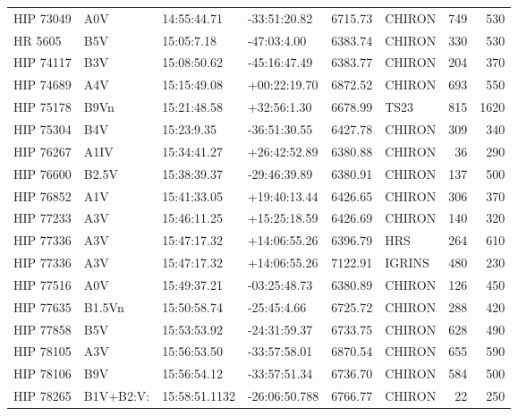 \documentclass{emulateapj}
\begin{document}
\begin{longtable*}{|l|lllrlrr|}
   HIP 73049 &            A0V &    14:55:44.71 &   -33:51:20.82 &  6715.73 &     CHIRON &      749 &     530 \\
     HR 5605 &            B5V &     15:05:7.18 &    -47:03:4.00 &  6383.74 &     CHIRON &      330 &     530 \\
   HIP 74117 &            B3V &    15:08:50.62 &   -45:16:47.49 &  6383.77 &     CHIRON &      204 &     370 \\
   HIP 74689 &            A4V &    15:15:49.08 &   +00:22:19.70 &  6872.52 &     CHIRON &      693 &     550 \\
   HIP 75178 &           B9Vn &    15:21:48.58 &    +32:56:1.30 &  6678.99 &       TS23 &      815 &    1620 \\
   HIP 75304 &            B4V &     15:23:9.35 &   -36:51:30.55 &  6427.78 &     CHIRON &      309 &     340 \\
   HIP 76267 &           A1IV &    15:34:41.27 &   +26:42:52.89 &  6380.88 &     CHIRON &       36 &     290 \\
   HIP 76600 &          B2.5V &    15:38:39.37 &   -29:46:39.89 &  6380.91 &     CHIRON &      137 &     500 \\
   HIP 76852 &            A1V &    15:41:33.05 &   +19:40:13.44 &  6426.65 &     CHIRON &      306 &     370 \\
   HIP 77233 &            A3V &    15:46:11.25 &   +15:25:18.59 &  6426.69 &     CHIRON &      140 &     320 \\
   HIP 77336 &            A3V &    15:47:17.32 &   +14:06:55.26 &  6396.79 &        HRS &      264 &     610 \\
   HIP 77336 &            A3V &    15:47:17.32 &   +14:06:55.26 &  7122.91 &     IGRINS &      480 &     230 \\
   HIP 77516 &            A0V &    15:49:37.21 &   -03:25:48.73 &  6380.89 &     CHIRON &      126 &     450 \\
   HIP 77635 &         B1.5Vn &    15:50:58.74 &    -25:45:4.66 &  6725.72 &     CHIRON &      288 &     420 \\
   HIP 77858 &            B5V &    15:53:53.92 &   -24:31:59.37 &  6733.75 &     CHIRON &      628 &     490 \\
   HIP 78105 &            A3V &    15:56:53.50 &   -33:57:58.01 &  6870.54 &     CHIRON &      655 &     590 \\
   HIP 78106 &            B9V &    15:56:54.12 &   -33:57:51.34 &  6736.70 &     CHIRON &      584 &     500 \\
   HIP 78265 &      B1V+B2:V: &  15:58:51.1132 &  -26:06:50.788 &  6766.77 &     CHIRON &       22 &     250 \\

\end{longtable*}
\end{document}
